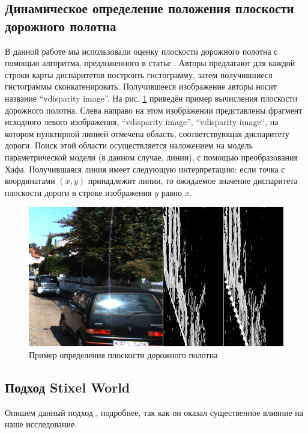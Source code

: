 \documentclass[aps,%
14pt,%
final,%
oneside,
onecolumn,%
musixtex, %
superscriptaddress,%
centertags]{extarticle} %
\begin{document}
\subsection{Динамическое определение положения плоскости дорожного полотна}\label{vdisparity_explanation}

В данной работе мы использовали оценку плоскости дорожного полотна с помощью алгоритма, предложенного в статье \cite{labayrade2002real}. Авторы предлагают для каждой строки карты диспаритетов построить гистограмму, затем получившиеся гистограммы сконкатенировать. Получившееся изображение авторы носит название ``vdisparity image''. На рис. \ref{fig:vdisp_example} приведён пример вычисления плоскости дорожного полотна. Слева направо на этом изображении представлены фрагмент исходного левого изображения, ``vdisparity image'', ``vdisparity image``, на котором пунктирной линией отмечена область, соответствующая диспаритету дороги. Поиск этой области осуществляется наложением на модель параметрической модели (в данном случае, линии), с помощью преобразования Хафа. Получившаяся линия имеет следующую интерпретацию: если точка с координатами $(x, y)$ принадлежит линии, то ожидаемое значение диспаритета плоскости дороги в строке изображения $y$ равно $x$.

\begin{figure}[htp]
\centering
\includegraphics[width=\textwidth]{vdisp_concat.png}
\caption{Пример определения плоскости дорожного полотна}
\label{fig:vdisp_example}
\end{figure}

\subsection{Подход Stixel World} \label{sec:stixels}

Опишем данный подход \cite{pfeiffer2010efficient}, подробнее, так как он оказал существенное влияние на наше исследование.
\end{document}
